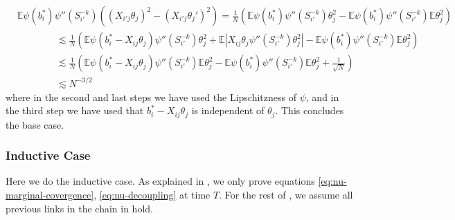 \documentclass{article}
\newcommand{\1}{\mathbbm{1}}
\theoremstyle{plain}
\theoremstyle{definition}
\theoremstyle{remark}
\newcommand{\E}{\mathbb{E}}
\begin{document}
    \begin{align*}
        &\E\psi(b^*_i)\psi''(S_{i'}^{-k})((X_{i'j}\theta_j)^2 - (X_{i'j}\theta_j')^2) = \frac{1}{N}\left(\E\psi(b^*_i)\psi''(S_{i'}^{-k})\theta_j^2 - \E\psi(b^*_i)\psi''(S_{i'}^{-k})\E\theta_j^2\right) \\
         &\qquad \qquad\lesssim \frac{1}{N}\left(\E\psi(b^*_i-X_{ij}\theta_j)\psi''(S_{i'}^{-k})\theta_j^2 + \E|X_{ij}\theta_j\psi''(S_{i'}^{-k})\theta_j^2| - \E\psi(b^*_i)\psi''(S_{i'}^{-k})\E\theta_j^2\right) \\
        &\qquad \qquad\lesssim \frac{1}{N}\left(\E\psi(b^*_i-X_{ij}\theta_j)\psi''(S_{i'}^{-k})\E\theta_j^2 - \E\psi(b^*_i)\psi''(S_{i'}^{-k})\E\theta_j^2 + \frac{1}{\sqrt{N}}\right) \\
        &\qquad \qquad\lesssim N^{-3/2}
    \end{align*}
    where in the second and last steps we have used the Lipschitzness of $\psi$, and in the third step we have used that $b^*_i - X_{ij}\theta_j$ is independent of $\theta_j$. This concludes the base case.

\subsubsection{Inductive Case}
Here we do the inductive case. As explained in , we only prove equations \eqref{eq:nu-marginal-covergence}, \eqref{eq:nu-decoupling} at time $T$. For the rest of , we assume all previous links in the chain in  hold.
\end{document}
